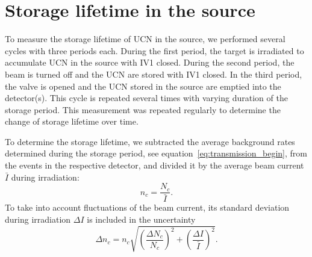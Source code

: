 \documentclass[10pt,letterpaper]{article}
\begin{document}
\section{Storage lifetime in the source}
\label{sec:storagelifetime}

To measure the storage lifetime of UCN in the source, we performed several cycles with three periods each. During the first period, the target is irradiated to accumulate UCN in the source with IV1 closed. During the second period, the beam is turned off and the UCN are stored with IV1 closed. In the third period, the valve is opened and the UCN stored in the source are emptied into the detector(s). This cycle is repeated several times with varying duration of the storage period. This measurement was repeated regularly to determine the change of storage lifetime over time.

To determine the storage lifetime, we subtracted the average background rates determined during the storage period, see equation~\ref{eq:transmission_begin}, from the events in the respective detector, and divided it by the average beam current $\bar{I}$ during irradiation:
\begin{equation}
n_c = \frac{N_c}{\bar{I}}.
\end{equation}
To take into account fluctuations of the beam current, its standard deviation during irradiation $\Delta I$ is included in the uncertainty
\begin{equation}
\Delta n_c = n_c \sqrt{ \left( \frac{\Delta N_c}{N_c} \right)^2 + \left( \frac{\Delta I}{\bar{I}} \right)^2 }.
\end{equation}
\end{document}
